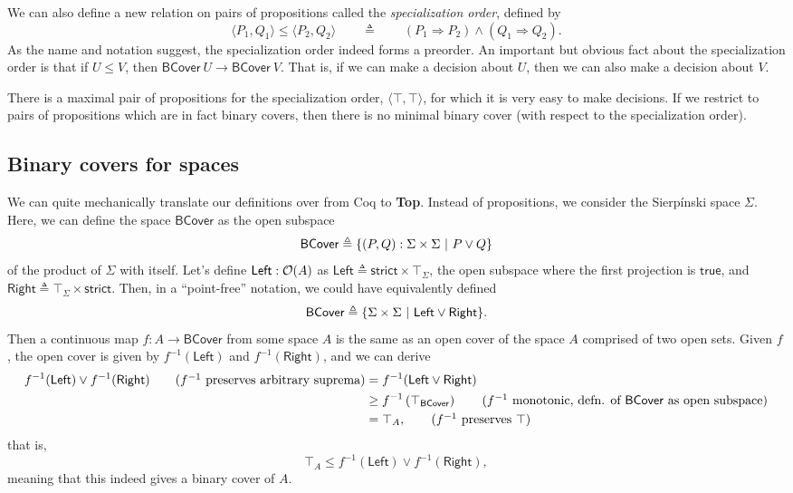We can also define a new relation on pairs of propositions called the \emph{specialization order}, defined by
\[
\langle P_1, Q_1 \rangle \le \langle P_2, Q_2 \rangle
\qquad \triangleq \qquad 
(P_1 \Rightarrow P_2) \wedge (Q_1 \Rightarrow Q_2).
\]
As the name and notation suggest, the specialization order indeed forms a preorder. An important but obvious fact about the specialization order is that if $U \le V$, then $\mathsf{BCover}\ U \to \mathsf{BCover} \ V$. That is, if we can make a decision about $U$, then we can also make a decision about $V$.

There is a maximal pair of propositions for the specialization order, $\langle \top, \top \rangle$, for which it is very easy to make decisions. If we restrict to pairs of propositions which are in fact binary covers, then there is no minimal binary cover (with respect to the specialization order).

\subsection{Binary covers for spaces}

We can quite mechanically translate our definitions over from Coq to \textbf{Top}. Instead of propositions, we consider the Sierp\'inski space $\Sigma$. Here, we can define the space $\mathsf{BCover}$ as the open subspace
\[
\mathsf{BCover} \triangleq \{ (P, Q) : \Sigma \times \Sigma \ |\  P \vee Q \}
\]
of the product of $\Sigma$ with itself. Let's define $\mathsf{Left} : \mathcal{O}({A})$ as $\mathsf{Left} \triangleq \mathsf{strict} \times \top_\Sigma$, the open subspace where the first projection is $\mathsf{true}$, and $\mathsf{Right} \triangleq \top_\Sigma \times \mathsf{strict}$. Then, in a ``point-free'' notation, we could have equivalently defined
\[
\mathsf{BCover} \triangleq \{ \Sigma \times \Sigma \ |\  \mathsf{Left} \vee \mathsf{Right} \}.
\]
Then a continuous map $f : A \to \mathsf{BCover}$ from some space $A$ is the same as an open cover of the space $A$ comprised of two open sets.  Given $f$, the open cover is given by $f^{-1}(\mathsf{Left})$ and $f^{-1}(\mathsf{Right})$, and we can derive
\begin{align*}
f^{-1}(\mathsf{Left}) \vee f^{-1}(\mathsf{Right})
\tag{$f^{-1}$ preserves arbitrary suprema}
&= f^{-1}(\mathsf{Left} \vee \mathsf{Right})
\\ &\ge f^{-1}\left (\top_\mathsf{BCover} \right)  \tag{$f^{-1}$ monotonic, defn. of $\mathsf{BCover}$ as open subspace}
\\ &= \top_A, \tag{$f^{-1}$ preserves $\top$}
\end{align*}
that is,
\[
\top_A \le f^{-1}(\mathsf{Left}) \vee f^{-1}(\mathsf{Right}),
\]
meaning that this indeed gives a binary cover of $A$.

